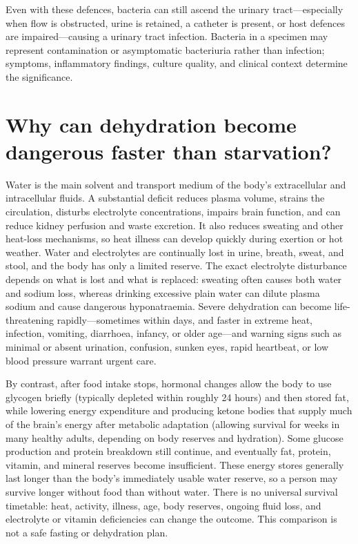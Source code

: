 \documentclass[11pt,oneside]{report}
\begin{document}
Even with these defences, bacteria can still ascend the urinary tract---especially
when flow is obstructed, urine is retained, a catheter is present, or host
defences are impaired---causing a urinary tract infection. Bacteria in a
specimen may represent contamination or asymptomatic bacteriuria rather than
infection; symptoms, inflammatory findings, culture quality, and clinical
context determine the significance.

\section{Why can dehydration become dangerous faster than starvation?}

Water is the main solvent and transport medium of the body's extracellular and
intracellular fluids. A substantial deficit reduces plasma volume, strains the
circulation, disturbs electrolyte concentrations, impairs brain function, and
can reduce kidney perfusion and waste excretion. It also reduces sweating and
other heat-loss mechanisms, so heat illness can develop quickly during
exertion or hot weather. Water and electrolytes are continually lost in urine,
breath, sweat, and stool, and the body has only a limited reserve. The exact
electrolyte disturbance depends on what is lost and what is replaced: sweating
often causes both water and sodium loss, whereas drinking excessive plain water
can dilute plasma sodium and cause dangerous hyponatraemia. Severe dehydration can become life-threatening rapidly—sometimes within days,
and faster in extreme heat, infection, vomiting, diarrhoea, infancy, or older
age—and warning signs such as minimal or absent urination, confusion, sunken
eyes, rapid heartbeat, or low blood pressure warrant urgent care.

By contrast, after food intake stops, hormonal changes allow the body to use
glycogen briefly (typically depleted within roughly 24 hours) and then stored
fat, while lowering energy expenditure and producing ketone bodies that supply
much of the brain's energy after metabolic adaptation (allowing survival for
weeks in many healthy adults, depending on body reserves and hydration). Some glucose production and protein breakdown still continue, and
eventually fat, protein, vitamin, and mineral reserves become insufficient.
These energy stores generally last longer than the body's immediately usable
water reserve, so a person may survive longer without food than without water.
There is no universal survival timetable: heat, activity, illness, age, body
reserves, ongoing fluid loss, and electrolyte or vitamin deficiencies can change
the outcome. This comparison is not a safe fasting or dehydration plan.
\end{document}
